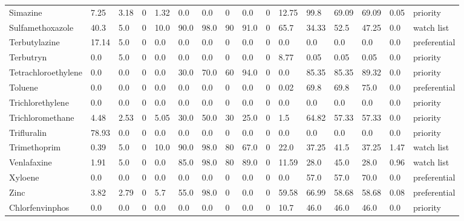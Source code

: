 \begin{tabular}{llllllllllllllll}
\cline{1-16}
Simazine & 7.25 & 3.18 & 0 & 1.32 & 0.0 & 0.0 & 0 & 0.0 & 0 & 12.75 & 99.8 & 69.09 & 69.09 & 0.05 & priority \\
\cline{1-16}
Sulfamethoxazole & 40.3 & 5.0 & 0 & 10.0 & 90.0 & 98.0 & 90 & 91.0 & 0 & 65.7 & 34.33 & 52.5 & 47.25 & 0.0 & watch list \\
\cline{1-16}
Terbutylazine & 17.14 & 5.0 & 0 & 0.0 & 0.0 & 0.0 & 0 & 0.0 & 0 & 0.0 & 0.0 & 0.0 & 0.0 & 0.0 & preferential \\
\cline{1-16}
Terbutryn & 0.0 & 5.0 & 0 & 0.0 & 0.0 & 0.0 & 0 & 0.0 & 0 & 8.77 & 0.05 & 0.05 & 0.05 & 0.0 & priority \\
\cline{1-16}
Tetrachloroethylene & 0.0 & 0.0 & 0 & 0.0 & 30.0 & 70.0 & 60 & 94.0 & 0 & 0.0 & 85.35 & 85.35 & 89.32 & 0.0 & priority \\
\cline{1-16}
Toluene & 0.0 & 0.0 & 0 & 0.0 & 0.0 & 0.0 & 0 & 0.0 & 0 & 0.02 & 69.8 & 69.8 & 75.0 & 0.0 & preferential \\
\cline{1-16}
Trichlorethylene & 0.0 & 0.0 & 0 & 0.0 & 0.0 & 0.0 & 0 & 0.0 & 0 & 0.0 & 0.0 & 0.0 & 0.0 & 0.0 & priority \\
\cline{1-16}
Trichloromethane & 4.48 & 2.53 & 0 & 5.05 & 30.0 & 50.0 & 30 & 25.0 & 0 & 1.5 & 64.82 & 57.33 & 57.33 & 0.0 & priority \\
\cline{1-16}
Trifluralin & 78.93 & 0.0 & 0 & 0.0 & 0.0 & 0.0 & 0 & 0.0 & 0 & 0.0 & 0.0 & 0.0 & 0.0 & 0.0 & priority \\
\cline{1-16}
Trimethoprim & 0.39 & 5.0 & 0 & 10.0 & 90.0 & 98.0 & 80 & 67.0 & 0 & 22.0 & 37.25 & 41.5 & 37.25 & 1.47 & watch list \\
\cline{1-16}
Venlafaxine & 1.91 & 5.0 & 0 & 0.0 & 85.0 & 98.0 & 80 & 89.0 & 0 & 11.59 & 28.0 & 45.0 & 28.0 & 0.96 & watch list \\
\cline{1-16}
Xyloene & 0.0 & 0.0 & 0 & 0.0 & 0.0 & 0.0 & 0 & 0.0 & 0 & 0.0 & 57.0 & 57.0 & 70.0 & 0.0 & preferential \\
\cline{1-16}
Zinc & 3.82 & 2.79 & 0 & 5.7 & 55.0 & 98.0 & 0 & 0.0 & 0 & 59.58 & 66.99 & 58.68 & 58.68 & 0.08 & preferential \\
\cline{1-16}
Chlorfenvinphos & 0.0 & 0.0 & 0 & 0.0 & 0.0 & 0.0 & 0 & 0.0 & 0 & 10.7 & 46.0 & 46.0 & 46.0 & 0.0 & priority \\
\cline{1-16}
\end{tabular}
